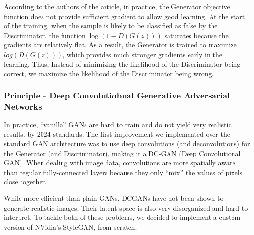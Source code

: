 \documentclass{article}
\begin{document}
According to the authors of the article, in practice, the Generator objective function does not provide sufficient gradient to allow good learning. At the start of the training, when the sample is likely to be classified as false by the Discriminator, the function $\log(1 - D(G(z)))$  saturates because the gradients are relatively flat. As a result, the Generator is trained to maximize $log(D(G(z)))$, which provides much stronger gradients early in the learning. Thus, Instead of minimizing the likelihood of the Discriminator being correct, we maximize the likelihood of the Discriminator being wrong. 

\subsubsection*{Principle - Deep Convolutiobnal Generative Adversarial Networks}
In practice, “vanilla” GANs are hard to train and do not yield very realistic results, by 2024 standards. The first improvement we implemented over the standard GAN architecture was to use deep convolutions (and deconvolutions) for the Generator (and Discriminator), making it a DC-GAN (Deep Convolutional GAN). When dealing with image data, convolutions are more spatially aware than regular fully-connected layers because they only “mix” the values of pixels close together.

While more efficient than plain GANs, DCGANs have not been shown to generate realistic images. Their latent space is also very disorganized and hard to interpret. To tackle both of these problems, we decided to implement a custom version of NVidia’s StyleGAN, from scratch.
\end{document}
